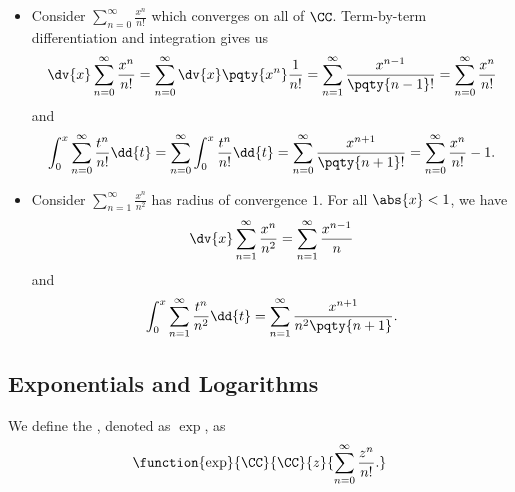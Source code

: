 \begin{examples}
    \label{ex:differentiating-integrating-power-series}%
    \begin{itemize}
        \item Consider \(\sum_{n = 0}^{\infty} \frac{x^n}{n!}\) which converges on all of \(\CC\). Term-by-term differentiation and integration gives us
        \[
            \dv{x} \sum_{n = 0}^{\infty} \frac{x^n}{n!} = \sum_{n = 0}^{\infty} \dv{x} \pqty{x^n} \frac{1}{n!} = \sum_{n = 1}^{\infty} \frac{x^{n - 1}}{\pqty{n - 1}!} = \sum_{n = 0}^{\infty} \frac{x^n}{n!}
        \]
        and
        \[
            \int_{0}^{x} \sum_{n = 0}^{\infty} \frac{t^n}{n!} \dd{t} = \sum_{n = 0}^{\infty} \int_{0}^{x} \frac{t^n}{n!} \dd{t} = \sum_{n = 0}^{\infty} \frac{x^{n + 1}}{\pqty{n + 1}!} = \sum_{n = 0}^{\infty} \frac{x^n}{n!} - 1.
        \]
        \item Consider \(\sum_{n = 1}^{\infty} \frac{x^n}{n^2}\) has radius of convergence \(1\). For all \(\abs{x} < 1\), we have
        \[
            \dv{x} \sum_{n = 1}^{\infty} \frac{x^n}{n^2} = \sum_{n = 1}^{\infty} \frac{x^{n - 1}}{n}
        \]
        and
        \[
            \int_{0}^{x} \sum_{n = 1}^{\infty} \frac{t^n}{n^2} \dd{t} = \sum_{n = 1}^{\infty} \frac{x^{n + 1}}{n^2 \pqty{n + 1}}.
        \]
    \end{itemize}
\end{examples}

\subsection{Exponentials and Logarithms}

\begin{definition}
    \label{def:exponential-function}%
    We define the , denoted as \(\exp\), as
    \[
        \function{\exp}{\CC}{\CC}{z}{\sum_{n = 0}^{\infty} \frac{z^n}{n!}.}
    \]
\end{definition}

